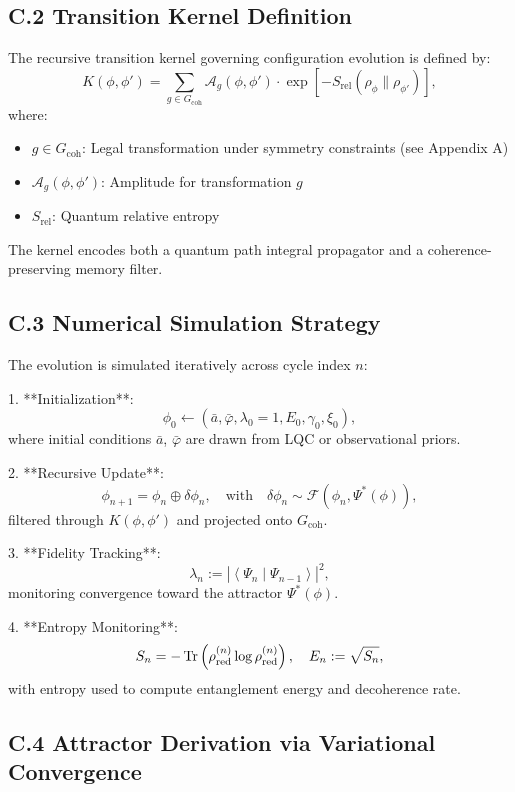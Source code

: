 \documentclass[11pt]{article}
\begin{document}
\subsection*{C.2 Transition Kernel Definition}

The recursive transition kernel governing configuration evolution is defined by:
\[
K(\phi, \phi') = \sum_{g \in G_{\text{coh}}} \mathcal{A}_g(\phi, \phi') \cdot \exp\left[ -S_{\text{rel}}(\rho_\phi \| \rho_{\phi'}) \right],
\]
where:

\begin{itemize}[leftmargin=1.5em]
  \item $g \in G_{\text{coh}}$: Legal transformation under symmetry constraints (see Appendix A)
  \item $\mathcal{A}_g(\phi, \phi')$: Amplitude for transformation $g$
  \item $S_{\text{rel}}$: Quantum relative entropy~\cite{nielsen2010quantum}
\end{itemize}

The kernel encodes both a quantum path integral propagator and a coherence-preserving memory filter.

\subsection*{C.3 Numerical Simulation Strategy}

The evolution is simulated iteratively across cycle index $n$:

1. **Initialization**:
   \[
   \phi_0 \gets (\bar{a}, \bar{\varphi}, \lambda_0 = 1, E_0, \gamma_0, \xi_0),
   \]
   where initial conditions $\bar{a}$, $\bar{\varphi}$ are drawn from LQC or observational priors.

2. **Recursive Update**:
   \[
   \phi_{n+1} = \phi_n \oplus \delta \phi_n, \quad \text{with} \quad \delta \phi_n \sim \mathcal{F}(\phi_n, \Psi^*(\phi)),
   \]
   filtered through $K(\phi, \phi')$ and projected onto $G_{\text{coh}}$.

3. **Fidelity Tracking**:
   \[
   \lambda_n := \left| \left\langle \Psi_n \middle| \Psi_{n-1} \right\rangle \right|^2,
   \]
   monitoring convergence toward the attractor $\Psi^*(\phi)$.

4. **Entropy Monitoring**:
   \[
   S_n = -\Tr\left( \rho_{\text{red}}^{(n)} \log \rho_{\text{red}}^{(n)} \right), \quad
   E_n := \sqrt{S_n},
   \]
   with entropy used to compute entanglement energy and decoherence rate.

\subsection*{C.4 Attractor Derivation via Variational Convergence}
\end{document}
